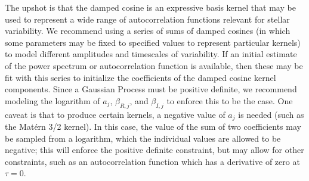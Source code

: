 \documentclass[manuscript, letterpaper]{aastex6}
\begin{document}
The upshot is that the damped cosine is an expressive basis kernel that may be used
to represent a wide range of autocorrelation functions relevant for stellar variability.
We recommend using a series of sums of damped cosines (in which some parameters may be 
fixed to specified values to represent particular kernels) to model different amplitudes
and timescales of variability.  If an initial estimate of the power spectrum or
autocorrelation function is available, then these may be fit with this series to
initialize the coefficients of the damped cosine kernel components.
Since a Gaussian Process
must be positive definite, we recommend modeling the logarithm of $a_j$,
$\beta_{R,j}$, and $\beta_{I,j}$ to enforce this to be the case.  One caveat is
that to produce certain kernels, a negative value of $a_j$ is needed (such
as the Mat\'ern 3/2 kernel).  In this case, the value of the sum of
two coefficients may be sampled from a logarithm, which the individual
values are allowed to be negative;  this will enforce the positive definite
constraint, but may allow for other constraints, such as an autocorrelation
function which has a derivative of zero at $\tau = 0$.
\end{document}
